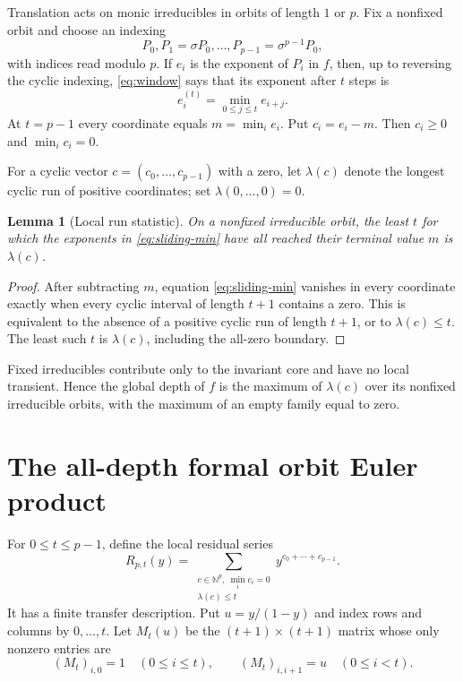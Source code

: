 \documentclass[10pt,a4paper]{amsart}
\newtheorem{lemma}[theorem]{Lemma}
\theoremstyle{definition}
\theoremstyle{remark}
\newcommand{\N}{\mathbb N}
\begin{document}
Translation acts on monic irreducibles in orbits of length $1$ or $p$.
Fix a nonfixed orbit and choose an indexing
\[
 P_0,P_1=\sigma P_0,\ldots,P_{p-1}=\sigma^{p-1}P_0,
\]
with indices read modulo $p$.  If $e_i$ is the exponent of $P_i$ in $f$,
then, up to reversing the cyclic indexing, \eqref{eq:window} says that its
exponent after $t$ steps is
\begin{equation}\label{eq:sliding-min}
              e_i^{(t)}=\min_{0\leq j\leq t}e_{i+j}.
\end{equation}
At $t=p-1$ every coordinate equals $m=\min_i e_i$.  Put
$c_i=e_i-m$.  Then $c_i\geq0$ and $\min_i c_i=0$.

For a cyclic vector $c=(c_0,\ldots,c_{p-1})$ with a zero, let
$\lambda(c)$ denote the longest cyclic run of positive coordinates; set
$\lambda(0,\ldots,0)=0$.

\begin{lemma}[Local run statistic]\label{lem:run}
On a nonfixed irreducible orbit, the least $t$ for which the exponents in
\eqref{eq:sliding-min} have all reached their terminal value $m$ is
$\lambda(c)$.
\end{lemma}

\begin{proof}
After subtracting $m$, equation \eqref{eq:sliding-min} vanishes in every
coordinate exactly when every cyclic interval of length $t+1$ contains a
zero.  This is equivalent to the absence of a positive cyclic run of length
$t+1$, or to $\lambda(c)\leq t$.  The least such $t$ is
$\lambda(c)$, including the all-zero boundary.
\end{proof}

Fixed irreducibles contribute only to the invariant core and have no local
transient.  Hence the global depth of $f$ is the maximum of
$\lambda(c)$ over its nonfixed irreducible orbits, with the maximum of an
empty family equal to zero.

\section{The all-depth formal orbit Euler product}

For $0\leq t\leq p-1$, define the local residual series
\begin{equation}\label{eq:R-definition}
 R_{p,t}(y)=
 \sum_{\substack{c\in\N^p,\ \min_i c_i=0\\\lambda(c)\leq t}}
 y^{c_0+\cdots+c_{p-1}}.
\end{equation}
It has a finite transfer description.  Put $u=y/(1-y)$ and index rows and
columns by $0,\ldots,t$.  Let $M_t(u)$ be the $(t+1)\times(t+1)$ matrix
whose only nonzero entries are
\begin{equation}\label{eq:M}
 (M_t)_{i,0}=1\quad(0\leq i\leq t),\qquad
 (M_t)_{i,i+1}=u\quad(0\leq i<t).
\end{equation}
\end{document}

